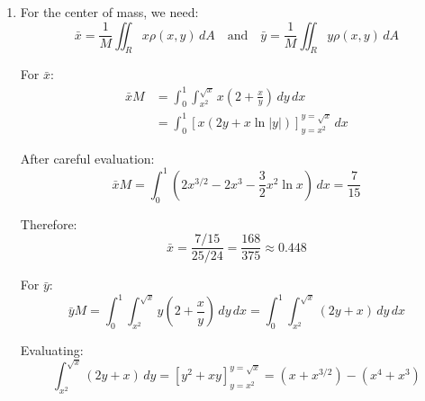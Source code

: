 \begin{example}
\begin{solution}
\begin{enumerate}
    Integrate with respect to $y$ first:
    \[
    \int_{x^2}^{\sqrt{x}} \left(2 + \frac{x}{y}\right)\,dy = \left[2y + x\ln|y|\right]_{y=x^2}^{y=\sqrt{x}}
    \]
    \[
    = \left(2\sqrt{x} + x\ln(\sqrt{x})\right) - \left(2x^2 + x\ln(x^2)\right)
    \]

    Recall $\ln(\sqrt{x}) = \frac{1}{2}\ln(x)$ and $\ln(x^2) = 2\ln(x)$, giving:
    \[
    2\sqrt{x} - 2x^2 + x\left(\frac{1}{2}\ln x - 2\ln x\right) = 2\sqrt{x} - 2x^2 - \frac{3}{2}x\ln x
    \]

    Hence:
    \[
    M = \int_0^1 \left(2\sqrt{x} - 2x^2 - \frac{3}{2}x\ln x\right)\,dx
    \]

    An antiderivative is:
    \begin{align*}
    &\int 2\sqrt{x}\,dx = \frac{4}{3}x^{3/2}, \\
    &\int -2x^2\,dx = -\frac{2}{3}x^3, \\
    &\int -\frac{3}{2}x\ln x\,dx = -\frac{3}{4}x^2\ln x + \frac{3}{8}x^2
    \end{align*}

    Therefore:
    \[
    \left[\frac{4}{3}x^{3/2} - \frac{2}{3}x^3 - \frac{3}{4}x^2\ln x + \frac{3}{8}x^2\right]_0^1 = \frac{4 - 2}{3} + \frac{3}{8} = \frac{25}{24}
    \]

    Thus: 
    \[
    M = \frac{25}{24} \approx 1.0417 \text{ kg}
    \]

    \item For the center of mass, we need:
    \[
    \bar{x} = \frac{1}{M}\iint_R x\rho(x,y)\,dA \quad\text{and}\quad \bar{y} = \frac{1}{M}\iint_R y\rho(x,y)\,dA
    \]

    For $\bar{x}$:
    \begin{align*}
    \bar{x}M &= \int_0^1 \int_{x^2}^{\sqrt{x}} x\left(2 + \frac{x}{y}\right)\,dy\,dx \\
    &= \int_0^1 \left[x(2y + x\ln|y|)\right]_{y=x^2}^{y=\sqrt{x}}\,dx
    \end{align*}

    After careful evaluation:
    \[
    \bar{x}M = \int_0^1 \left(2x^{3/2} - 2x^3 - \frac{3}{2}x^2\ln x\right)\,dx = \frac{7}{15}
    \]

    Therefore:
    \[
    \bar{x} = \frac{7/15}{25/24} = \frac{168}{375} \approx 0.448
    \]

    For $\bar{y}$:
    \[
    \bar{y}M = \int_0^1 \int_{x^2}^{\sqrt{x}} y\left(2 + \frac{x}{y}\right)\,dy\,dx = \int_0^1 \int_{x^2}^{\sqrt{x}} (2y + x)\,dy\,dx
    \]

    Evaluating:
    \[
    \int_{x^2}^{\sqrt{x}} (2y + x)\,dy = \left[y^2 + xy\right]_{y=x^2}^{y=\sqrt{x}} = (x + x^{3/2}) - (x^4 + x^3)
    \]


\end{enumerate}
\end{solution}
\end{example}
